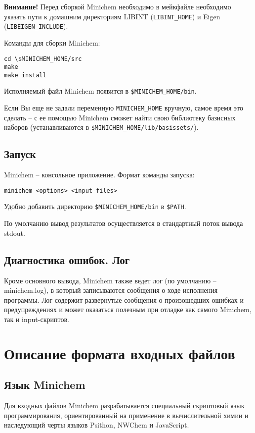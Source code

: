\documentclass[a4paper]{book}
\begin{document}
\textbf{Внимание!} Перед сборкой Minichem необходимо в мейкфайле необходимо указать пути к домашним директориям LIBINT (\texttt{LIBINT\_HOME})
и Eigen (\texttt{LIBEIGEN\_INCLUDE}).

Команды для сборки Minichem:

\begin{lstlisting}
cd \$MINICHEM_HOME/src
make
make install
\end{lstlisting}
Исполняемый файл Minichem появится в \texttt{\$MINICHEM\_HOME/bin}.

Если Вы еще не задали переменную \texttt{MINICHEM\_HOME} вручную, самое время это сделать -- с ее помощью Minichem сможет найти свою библиотеку
базисных наборов (устанавливаются в \texttt{\$MINICHEM\_HOME/lib/basissets/}).

\section{Запуск}
Minichem -- консольное приложение. Формат команды запуска:
\begin{lstlisting}
minichem <options> <input-files>
\end{lstlisting}
Удобно добавить директорию \texttt{\$MINICHEM\_HOME/bin} в \texttt{\$PATH}.

По умолчанию вывод результатов осуществляется в стандартный поток вывода stdout.

\section{Диагностика ошибок. Лог}
Кроме основного вывода, Minichem также ведет лог
(по умолчанию -- minichem.log), в который записываются сообщения о ходе исполнения программы. Лог содержит развернутые сообщения о произошедших
ошибках и предупреждениях и может оказаться полезным при отладке как самого Minichem, так и input-скриптов.

\chapter{Описание формата входных файлов}
\section{Язык Minichem}
Для входных файлов Minichem разрабатывается специальный скриптовый язык программирования, ориентированный на применение в вычислительной химии
и наследующий черты языков Psithon, NWChem и JavaScript.
\end{document}
